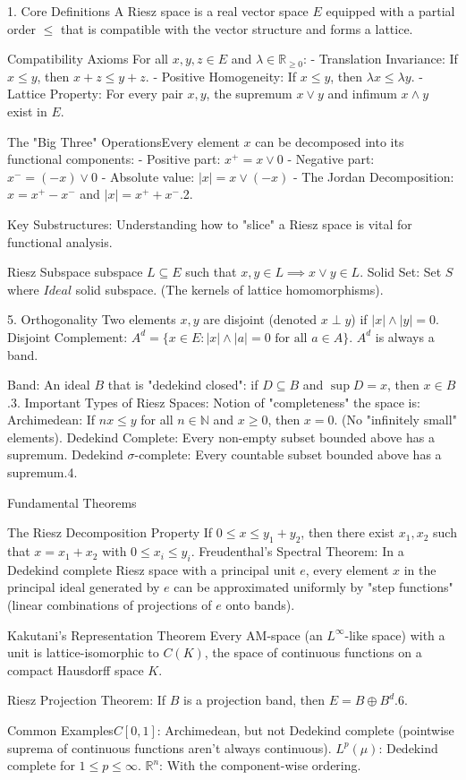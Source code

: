 1. Core Definitions
A Riesz space is a real vector space $E$ equipped with a partial order $\leq$ that is compatible with the vector structure and forms a lattice.

Compatibility Axioms
For all $x, y, z \in E$ and $\lambda \in \mathbb{R}_{\geq 0}$:
- Translation Invariance: If $x \leq y$, then $x + z \leq y + z$.
- Positive Homogeneity: If $x \leq y$, then $\lambda x \leq \lambda y$.
- Lattice Property: For every pair $x, y$, the supremum $x \vee y$ and infimum $x \wedge y$ exist in $E$.

The "Big Three" OperationsEvery element $x$ can be decomposed into its functional components:
- Positive part: $x^+ = x \vee 0$
- Negative part: $x^- = (-x) \vee 0$
- Absolute value: $|x| = x \vee (-x)$
- The Jordan Decomposition: $x = x^+ - x^-$ and $|x| = x^+ + x^-$.2. 

Key Substructures:
Understanding how to "slice" a Riesz space is vital for functional analysis.

Riesz Subspace subspace $L \subseteq E$ such that $x, y \in L \implies x \vee y \in L$.
Solid Set: Set $S$ where $Ideal$ solid subspace. (The kernels of lattice homomorphisms).

5. Orthogonality
Two elements $x, y$ are disjoint (denoted $x \perp y$) if $|x| \wedge |y| = 0$.
Disjoint Complement: $A^d = \{x \in E : |x| \wedge |a| = 0 \text{ for all } a \in A\}$. $A^d$ is always a band.

Band: An ideal $B$ that is "dedekind closed": if $D \subseteq B$ and $\sup D = x$, then $x \in B$.3. 
Important Types of Riesz Spaces: 
Notion of "completeness" the space is:
Archimedean: If $nx \leq y$ for all $n \in \mathbb{N}$ and $x \geq 0$, then $x = 0$. (No "infinitely small" elements).
Dedekind Complete: Every non-empty subset bounded above has a supremum.
Dedekind $\sigma$-complete: Every countable subset bounded above has a supremum.4. 

Fundamental Theorems

The Riesz Decomposition Property
If $0 \leq x \leq y_1 + y_2$, then there exist $x_1, x_2$ such that $x = x_1 + x_2$ with $0 \leq x_i \leq y_i$. 
Freudenthal’s Spectral Theorem:
In a Dedekind complete Riesz space with a principal unit $e$, every element $x$ in the principal ideal generated by $e$ can be approximated uniformly by "step functions" 
(linear combinations of projections of $e$ onto bands).

Kakutani’s Representation Theorem
Every AM-space (an $L^\infty$-like space) with a unit is lattice-isomorphic to $C(K)$, the space of continuous functions on a compact Hausdorff space $K$.

Riesz Projection Theorem: If $B$ is a projection band, then $E = B \oplus B^d$.6. 

Common Examples$C[0,1]$: Archimedean, but not Dedekind complete (pointwise suprema of continuous functions aren't always continuous).
$L^p(\mu)$: Dedekind complete for $1 \leq p \leq \infty$.
$\mathbb{R}^n$: With the component-wise ordering.
